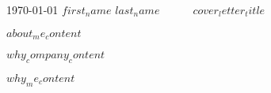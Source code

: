 \documentclass[11pt, a4paper]{awesome-cv}
\begin{document}
    \makecvheader[R]

    \makecvfooter
    {\today}
    {$first_name$ $last_name$~~~\textperiodcentered~~~$cover_letter_title$}
    {}

    \makelettertitle

    \begin{cvletter}

        $about_me_content$

        $why_company_content$

        $why_me_content$

    \end{cvletter}


    \makeletterclosing
\end{document}
